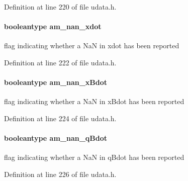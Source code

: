 Definition at line 220 of file udata.\+h.

\hypertarget{struct_user_data_a53aa8cfb8e4f8c3b6684b6947cc1f5c8}{}
\paragraph[{am\+\_\+nan\+\_\+xdot}]{\setlength{\rightskip}{0pt plus 5cm}booleantype am\+\_\+nan\+\_\+xdot}\label{struct_user_data_a53aa8cfb8e4f8c3b6684b6947cc1f5c8}
flag indicating whether a Na\+N in xdot has been reported 

Definition at line 222 of file udata.\+h.

\hypertarget{struct_user_data_a31f1bd5bfd2c4b1e679b77a96a35e912}{}
\paragraph[{am\+\_\+nan\+\_\+x\+Bdot}]{\setlength{\rightskip}{0pt plus 5cm}booleantype am\+\_\+nan\+\_\+x\+Bdot}\label{struct_user_data_a31f1bd5bfd2c4b1e679b77a96a35e912}
flag indicating whether a Na\+N in x\+Bdot has been reported 

Definition at line 224 of file udata.\+h.

\hypertarget{struct_user_data_ae0ff98d15a201a25bab372fe26bd1523}{}
\paragraph[{am\+\_\+nan\+\_\+q\+Bdot}]{\setlength{\rightskip}{0pt plus 5cm}booleantype am\+\_\+nan\+\_\+q\+Bdot}\label{struct_user_data_ae0ff98d15a201a25bab372fe26bd1523}
flag indicating whether a Na\+N in q\+Bdot has been reported 

Definition at line 226 of file udata.\+h.

